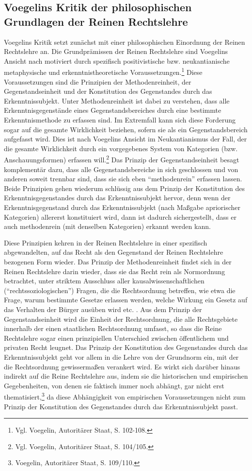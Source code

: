 \documentclass[12pt,a4paper,ngerman]{article}
\begin{document}
\subsection{Voegelins Kritik der philosophischen Grundlagen der Reinen
  Rechtslehre}

Voegelins Kritik setzt zunächst mit einer philosophischen Einordnung der
Reinen Rechtslehre an. Die Grundprämissen der Reinen Rechtslehre sind
Voegelins Ansicht nach motiviert durch spezifisch positivistische bzw.
neukantianische metaphysische und erkenntnistheoretische
Voraussetzungen.\footnote{Vgl. Voegelin, Autoritärer Staat, S.  102-108.}
Diese Voraussetzungen sind die Prinzipien der Methodenreinheit, der
Gegenstandseinheit und der Konstitution des Gegenstandes durch das
Erkenntnissubjekt. Unter Methodenreinheit ist dabei zu verstehen, dass alle
Erkenntnisgegenstände eines Gegenstandsbereiches durch eine bestimmte
Erkenntnismethode zu erfassen sind. Im Extremfall kann sich diese Forderung
sogar auf die gesamte Wirklichkeit beziehen, sofern sie als ein
Gegenstandsbereich aufgefasst wird. Dies ist nach Voegelins Ansicht im
Neukantianismus der Fall, der die gesamte Wirklichkeit durch ein vorgegebenes
System von Kategorien (bzw. Anschauungsformen) erfassen will.\footnote{Vgl.
  Voegelin, Autoritärer Staat, S. 104/105.} Das Prinzip der Gegenstandseinheit
besagt komplementär dazu, dass alle Gegenstandsbereiche in sich geschlossen
und von anderen soweit trennbar sind, dass sie sich eben "`methodenrein"'
erfassen lassen. Beide Prinzipien gehen wiederum schlüssig aus dem Prinzip der
Konstitution des Erkenntnisgegenstandes durch das Erkenntnissubjekt hervor,
denn wenn der Erkenntnisgegenstand durch das Erkenntnissubjekt (nach Maßgabe
apriorischer Kategorien) allererst konstituiert wird, dann ist dadurch
sichergestellt, dass er auch methodenrein (mit denselben Kategorien) erkannt
werden kann.

Diese Prinzipien kehren in der Reinen Rechtslehre in einer spezifisch
abgewandelten, auf das Recht als den Gegenstand der Reinen Rechtslehre
bezogenen Form wieder. Das Prinzip der Methodenreinheit findet sich in der
Reinen Rechtslehre darin wieder, dass sie das Recht rein als Normordnung
betrachtet, unter striktem Ausschluss aller kausalwissenschaftlichen
("`rechtssoziologischen"') Fragen, die die Rechtsordnung betreffen, wie etwa
die Frage, warum bestimmte Gesetze erlassen werden, welche Wirkung ein Gesetz
auf das Verhalten der Bürger ausüben wird etc. . Aus dem Prinzip der
Gegenstandseinheit wird die Einheit der Rechtsordnung, die alle Rechtsgebiete
innerhalb der einen staatlichen Rechtsordnung umfasst, so dass die Reine
Rechtslehre sogar einen prinzipiellen Unterschied zwischen öffentlichem und
privaten Recht leugnet. Das Prinzip der Konstitution des Gegenstandes durch
das Erkenntnissubjekt geht vor allem in die Lehre von der Grundnorm ein, mit
der die Rechtsordnung gewissermaßen verankert wird.  Es wirkt sich darüber
hinaus indirekt auf die Reine Rechtslehre aus, indem sie die historischen und
empirischen Gegebenheiten, von denen sie faktisch immer noch abhängt, gar
nicht erst thematisiert,\footnote{Voegelin, Autoritärer Staat, S. 109/110. }
da diese Abhängigkeit von empirischen Voraussetzungen nicht zum Prinzip der
Konstitution des Gegenstandes durch das Erkenntnissubjekt passt.
\end{document}
